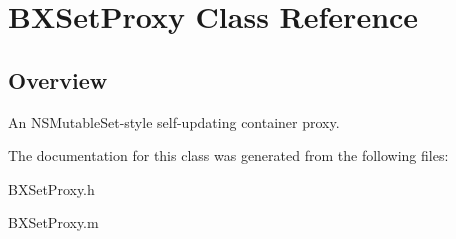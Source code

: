 \hypertarget{interface_b_x_set_proxy}{}\section{B\+X\+Set\+Proxy Class Reference}
\label{interface_b_x_set_proxy}


\subsection{Overview}
An N\+S\+Mutable\+Set-\/style self-\/updating container proxy. 

The documentation for this class was generated from the following files\+:\begin{DoxyCompactItemize}
\item 
B\+X\+Set\+Proxy.\+h\item 
B\+X\+Set\+Proxy.\+m\end{DoxyCompactItemize}
